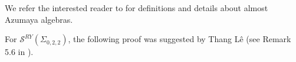 \documentclass{article}
\newcommand{\C}{\mathbb{C}}
\newcommand{\san}{\Sigma_{0,2,2}}
\newtheorem{proposition}[theorem]{Proposition}
\theoremstyle{definition}
\renewcommand{\san}{\Sigma_{0, 2, 2}}
\begin{document}
We  refer the interested reader to \cite{BrownGoodearl, FKBLUnicity} for definitions and details about almost Azumaya algebras.  




 For $\mathcal S^{RY}(\san)$, the following proof was suggested by Thang Lê (see Remark 5.6 in \cite{KaruoMoonWongCenter}).  







\end{document}
